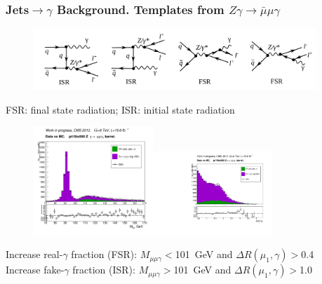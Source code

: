 \begin{frame}\frametitle{Jets$\rightarrow \gamma$ Background. Templates from $Z\gamma\rightarrow{\bar{\mu}}\mu\gamma$}

  \begin{figure}[htb]
      \begin{center}
        \scriptsize
          \includegraphics[width=0.95\textwidth]{../figs/ForPresentation/feynmZg_LO.png}
       \end{center}
    \end{figure}

\scriptsize
FSR: final state radiation; ISR: initial state radiation

  \begin{figure}[htb]
    \begin{center}
       \includegraphics[width=0.40\textwidth]{../figs/figs_v11/MUON_ZGamma/PrepareYields/c_TotalDATAvsMC_Barrel__MpholeplepVERY_PRELIMINARY_pt15to500_.png}\includegraphics[width=0.40\textwidth]{../figs/figs_v11/MUON_ZGamma/PrepareYields/c_TotalDATAvsMC_Barrel__lep1PhoDeltaRVERY_PRELIMINARY_pt15to500_.pdf}\\
    \end{center}
  \end{figure}
\scriptsize
Increase real-$\gamma$ fraction (FSR): $M_{\mu\mu\gamma}<$101~GeV and $\Delta R(\mu_{1},\gamma)>$0.4\\
Increase fake-$\gamma$ fraction (ISR): $M_{\mu\mu\gamma}>$101~GeV and $\Delta R(\mu_{1},\gamma)>$1.0

\end{frame}%
